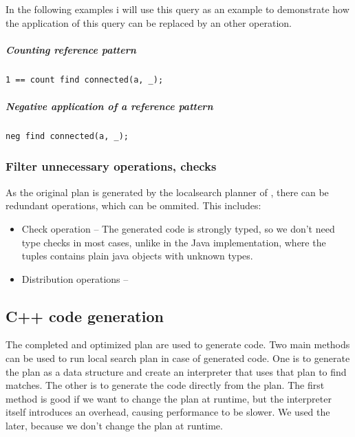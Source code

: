 In the following examples i will use this query as an example to demonstrate how the application of this query can be replaced by an other operation.

\subparagraph{Counting reference pattern} 

\begin{lstlisting}[language = vql]
1 == count find connected(a, _);
\end{lstlisting}


\subparagraph{Negative application of a reference pattern}

\begin{lstlisting}[language = vql]
neg find connected(a, _);
\end{lstlisting}

\subsubsection{Filter unnecessary operations, checks}
As the original plan is generated by the localsearch planner of \viatra{}, there can be redundant operations, which can be ommited. This includes:

\begin{itemize}
	\item Check operation -- The generated code is strongly typed, so we don't need type checks in most cases, unlike in the Java implementation, where the tuples contains plain java objects with unknown types.
	
	\item Distribution operations -- 
\end{itemize}



\subsection{C++ code generation}

The completed and optimized plan are used to generate \cpp{} code. 
Two main methods can be used to run local search plan in case of generated code. 
One is to generate the plan as a data structure and create an interpreter that uses that plan to find matches. 
The other is to generate the code directly from the plan. 
The first method is good if we want to change the plan at runtime, but the interpreter itself introduces an overhead, causing performance to be slower.
We used the later, because we don't change the plan at runtime.












